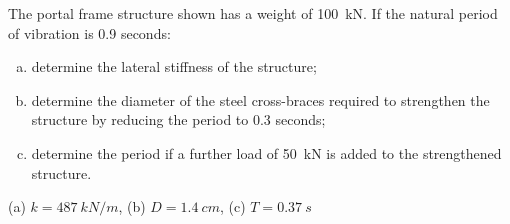 
\begin{Exercise}[label={frames_modification}]
The portal frame structure shown has a weight of \qty{100}{kN}. If the natural period of vibration is 0.9 seconds:
\begin{enumerate}[(a)]
    \item determine the lateral stiffness of the structure;
    \item determine the diameter of the steel cross-braces required to strengthen the structure by reducing the period to 0.3 seconds;
    \item determine the period if a further load of \qty{50}{kN} is added to the strengthened structure.
\end{enumerate}

\begin{center}
\end{center}

\shortAnswer (a) $k = \SI{487}{kN/m}$, (b) $D = \SI{1.4}{cm}$, (c) $T = \SI{0.37}{s}$
\end{Exercise}



